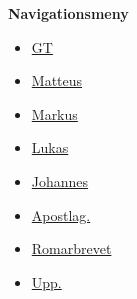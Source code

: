 \documentclass{article}
\begin{document}
\vspace*{-1em}
\noindent
\begin{center}
\textcolor{titlecolor}{\Large\textbf{Navigationsmeny}}
\vspace{0.5em}

\begin{multicols}{2}
\setlength{\columnseprule}{0pt}
\setlength{\columnsep}{10pt}
\setlength{\parskip}{4pt}

\begin{itemize}
  \item \hyperlink{GT}{GT}
  \item \hyperlink{Matteus 1}{Matteus}
  \item \hyperlink{Markus 1}{Markus}
  \item \hyperlink{Lukas 1}{Lukas}
  \item \hyperlink{Johannes}{Johannes}
  \item \hyperlink{Apostlagärningarna}{Apostlag.}
  \item \hyperlink{Romarbrevet}{Romarbrevet}
  \item \hyperlink{Uppenbarelseboken}{Upp.}
\end{itemize}
\end{multicols}
\end{center}

\vspace{1em}

%
%

\newpage





\end{document}
